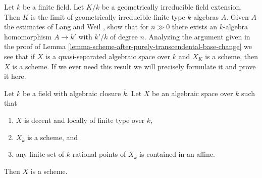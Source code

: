\begin{remark}
\label{remark-when-does-the-argument-work}
Let $k$ be a finite field. Let $K/k$ be a geometrically
irreducible field extension. Then $K$ is the limit of geometrically
irreducible finite type $k$-algebras $A$. Given $A$ the estimates
of Lang and Weil \cite{LW}, show that for $n \gg 0$ there exists
an $k$-algebra homomorphism $A \to k'$ with $k'/k$ of degree $n$.
Analyzing the argument given in the proof of
Lemma \ref{lemma-scheme-after-purely-transcendental-base-change}
we see that if $X$ is a quasi-separated algebraic space over $k$
and $X_K$ is a scheme, then $X$ is a scheme. If we ever need this
result we will precisely formulate it and prove it here.
\end{remark}

\begin{lemma}
\label{lemma-scheme-over-algebraic-closure-enough-affines}
Let $k$ be a field with algebraic closure $\overline{k}$. Let $X$
be an algebraic space over $k$ such that
\begin{enumerate}
\item $X$ is decent and locally of finite type over $k$,
\item $X_{\overline{k}}$ is a scheme, and
\item any finite set of $\overline{k}$-rational points of $X_{\overline{k}}$
is contained in an affine.
\end{enumerate}
Then $X$ is a scheme.
\end{lemma}

